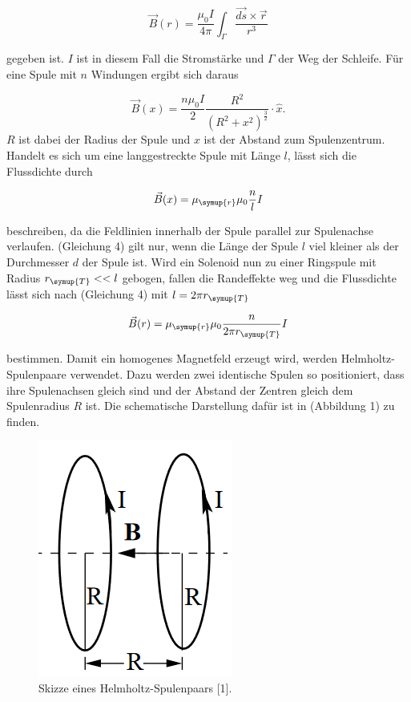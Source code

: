 \documentclass[
  bibliography=totoc,     %
  captions=tableheading,  %
  titlepage=firstiscover, %
]{scrartcl}
\begin{document}
  \begin{equation}
    \label{eqn:biotsavart}
    \vec{B}(r) = \frac{\mu_{0}I}{4\pi} \int_{\Gamma} \frac{\vec{ds}\times \vec{r}}{r^3}
  \end{equation}
  
  gegeben ist. $I$ ist in diesem Fall die Stromstärke und $\Gamma$ der Weg der Schleife. Für eine Spule mit
  $n$ Windungen ergibt sich daraus
  
  \begin{equation}
    \label{eqn:nSpule}
    \vec{B}(x) = \frac{n \mu_0 I}{2} \frac{R^2}{(R^2 + x^2)^{\frac{3}{2}}} \cdot \hat{x}.
  \end{equation}
  $R$ ist dabei der Radius der Spule und $x$ ist der Abstand zum Spulenzentrum. Handelt es sich um eine
  langgestreckte Spule mit Länge $l$, lässt sich die Flussdichte durch
  
  \begin{equation}
    \label{eqn:langeSpule}
    \vec{B}(x) = \mu_{\symup{r}}\mu_0 \frac{n}{l} I
  \end{equation}
  
  beschreiben, da die Feldlinien innerhalb der Spule parallel zur Spulenachse verlaufen.
  (Gleichung 4) gilt nur, wenn die Länge der Spule $l$ viel kleiner als der Durchmesser $d$
  der Spule ist. Wird ein Solenoid nun zu einer Ringspule mit Radius $r_{\symup{T}} << l$ gebogen, fallen die
  Randeffekte weg und die Flussdichte lässt sich nach (Gleichung 4) mit $l = 2\pi r_{\symup{T}}$
 
  \begin{equation}
    \label{eqn:ringspule}
    \vec{B}(r) = \mu_{\symup{r}}\mu_0 \frac{n}{2\pi r_{\symup{T}}} I
  \end{equation}
  
  bestimmen. Damit ein homogenes Magnetfeld erzeugt wird, werden Helmholtz-Spulenpaare verwendet. Dazu werden
  zwei identische Spulen so positioniert, dass ihre Spulenachsen gleich sind und der Abstand der Zentren
  gleich dem Spulenradius $R$ ist. Die schematische Darstellung dafür ist in (Abbildung 1) zu finden.
 
  \begin{figure}
    \centering
    \includegraphics[scale=0.5]{helmholtzspulenpaar.png}
    \caption{Skizze eines Helmholtz-Spulenpaars [1].}
    \label{fig:helmholtz}
  \end{figure}
  
\end{document}

